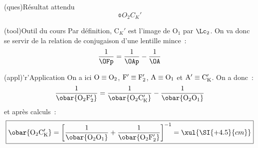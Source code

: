 \documentclass[../../main/main.tex]{subfiles}
\begin{document}
{	\subsubsection{}

	\begin{tcbraster}[raster columns=6, raster equal height=rows]
		\begin{tcolorbox}[blankest, raster multicolumn=3, space to=\myspacee]
			\begin{tcbraster}[raster columns=1]
				\begin{tcb}[raster multicolumn=1,
						add to natural height=\myspacee](ques){Résultat attendu}
					$$\obar{O_2C_K'}$$
				\end{tcb}
				\begin{tcb}[raster multicolumn=2](tool){Outil du cours}
					Par définition, C$_K'$ est l'image de O$_1$ par $\Lc_2$. On va
					donc se servir de la relation de conjugaison d'une lentille
					mince~:
					\[
						\frac{1}{\OFp} = \frac{1}{\OAp} - \frac{1}{\OA}
					\]
				\end{tcb}
			\end{tcbraster}
		\end{tcolorbox}
		\begin{tcb}[raster multicolumn=3](appl)'r'{Application}
			On a ici $\rm O \equiv O_2$, $\rm F' \equiv F_2'$, $\rm A \equiv O_1$ et
			$\rm A' \equiv C_K'$. On a donc~:
			\[
				\frac{1}{\obar{\rm O_2F_2'}} =
				\frac{1}{\obar{\rm O_2C_K'}} -
				\frac{1}{\obar{\rm O_2O_1}}
			\]
			et après calculs~:
			\[
				\boxed{\obar{\rm O_2C_K'} =
					\left[
						\frac{1}{\obar{\rm O_2O_1}} +
						\frac{1}{\obar{\rm O_2F_2'}}
						\right]^{-1} =
					\xul{\SI{+4.5}{cm}}
				}
			\]
		\end{tcb}
	\end{tcbraster}

}
\end{document}
